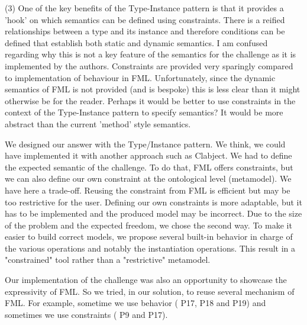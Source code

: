 \documentclass[10pt]{article}
\begin{document}
\begin{response}{(3) One of the key benefits of the Type-Instance pattern is that it provides a 'hook' on which semantics can be defined using constraints. There is a reified relationships between a type and its instance and therefore conditions can be defined that establish both static and dynamic semantics. I am confused regarding why this is not a key feature of the semantics for the challenge as it is implemented by the authors. Constraints are provided very sparingly compared to implementation of behaviour in FML. Unfortunately, since the dynamic semantics of FML is not provided (and is bespoke) this is less clear than it might otherwise be for the reader. Perhaps it would be better to use constraints in the context of the Type-Instance pattern to specify semantics? It would be more abstract than the current 'method' style semantics.}
{\color{red}
We designed our answer with the Type/Instance pattern. We think, we could have implemented it with another approach such as Clabject.
We had to define the expected semantic of the challenge. To do that, FML offers constraints, but we can also define our own constraint at the ontological level (metamodel). We have here a trade-off. Reusing the constraint from FML is efficient but may be too restrictive for the user. Defining our own constraints is more adaptable, but it has to be implemented and the produced model may be incorrect. Due to the size of the problem and the expected freedom, we chose the second way. To make it easier to build correct models, we propose several built-in behavior in charge of the various operations and notably the instantiation operations. This result in a "constrained" tool rather than a "restrictive" metamodel.

Our implementation of the challenge was also an opportunity to showcase the expressivity of FML. So we tried, in our solution, to reuse several mechanism of FML. For example, sometime we use behavior ({\color{teal} P17, P18 and P19}) and sometimes we use constraints ({\color{teal} P9 and P17}).}




\end{response}
\end{document}
